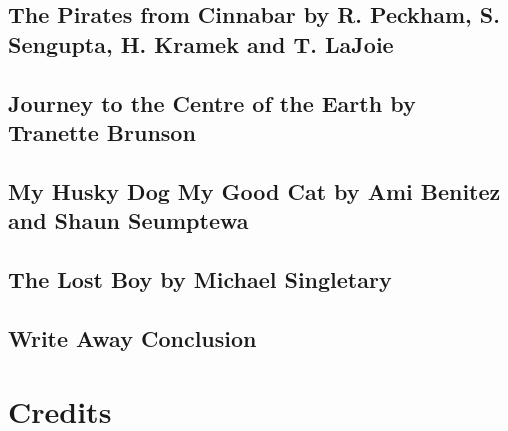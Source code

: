 \subsection{The Pirates from Cinnabar by R. Peckham, S. Sengupta, H. Kramek and T. LaJoie}

\subsection{Journey to the Centre of the Earth by Tranette Brunson}

\subsection{My Husky Dog My Good Cat by Ami Benitez and Shaun Seumptewa}

\subsection{The Lost Boy by Michael Singletary}

\subsection{Write Away Conclusion}

\section{Credits}